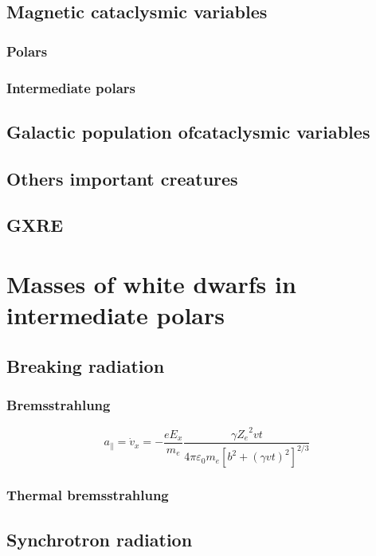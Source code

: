 \documentclass[oneside,a4paper,11pt]{report}
\begin{document}
\section{Magnetic cataclysmic variables}
\subsection{Polars}
\subsection{Intermediate polars}
\section{Galactic population ofcataclysmic variables }
\section{Others important creatures}
\section{GXRE}



\chapter{Masses of white dwarfs in intermediate polars}
\section{Breaking radiation}
\subsection{Bremsstrahlung}
\begin{equation}
 a_{\parallel} = \dot{v}_x = -\frac{eE_x}{m_e}\frac{\gamma {Z_e}^2 vt}{4\pi \varepsilon_0 m_e \left [ b^2 + \left ( \gamma vt \right )^2  \right ]^{2/3}} 
\end{equation}

\subsection{Thermal bremsstrahlung}



\section{Synchrotron radiation}
\end{document}
